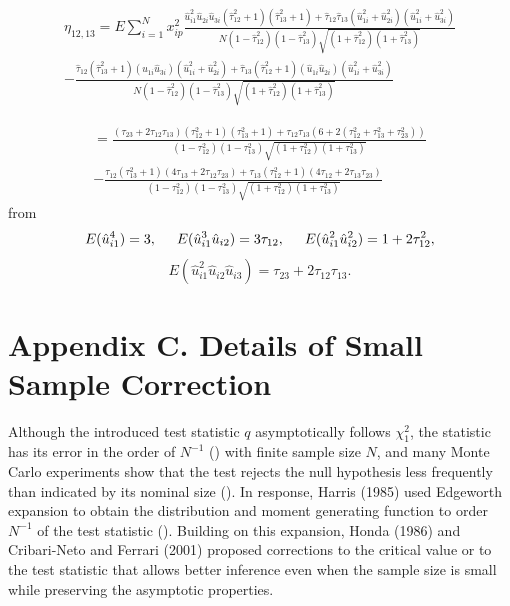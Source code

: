 \documentclass[aap,authoryear, preprint]{imsart}
\numberwithin{equation}{section}
\theoremstyle{plain}
\begin{document}
\begin{equation}
    \begin{multlined}
    \eta_{12,13} = E\sum_{i=1}^{N}x_{ip}^2  \frac{\hat{u}_{i1}^2 \hat{u}_{2i}\hat{u}_{3i}(\hat{\tau}_{12}^2+1)(\hat{\tau}_{13}^2+1)
    + \hat{\tau}_{12}\hat{\tau}_{13} (\hat{u}_{1i}^2 + \hat{u}_{2i}^2)(\hat{u}_{1i}^2 + \hat{u}_{3i}^2)}{N(1-\hat{\tau}_{12}^2)(1-\hat{\tau}_{13}^2)\sqrt{(1+\hat{\tau}_{12}^2)(1+\hat{\tau}_{13}^2)}} \\
    - \frac{\hat{\tau}_{12}(\hat{\tau}_{13}^2 + 1) (\hat{u}_{1i}\hat{u}_{3i})(\hat{u}_{1i}^2 + \hat{u}_{2i}^2) + \hat{\tau}_{13}(\hat{\tau}_{12}^2+1)(\hat{u}_{1i}\hat{u}_{2i})(\hat{u}_{1i}^2 + \hat{u}_{3i}^2)}{N(1-\hat{\tau}_{12}^2)(1-\hat{\tau}_{13}^2)\sqrt{(1+\hat{\tau}_{12}^2)(1+\hat{\tau}_{13}^2)}}
    \end{multlined} 
    \end{equation}
    
\begin{equation} \begin{multlined}
= \frac{(\tau_{23}+2\tau_{12}\tau_{13})(\tau_{12}^2+1)(\tau_{13}^2+1) + \tau_{12}\tau_{13}(6+2(\tau_{12}^2+\tau_{13}^2+\tau_{23}^2))}{(1-{\tau}_{12}^2)(1-{\tau}_{13}^2)\sqrt{(1+{\tau}_{12}^2)(1+{\tau}_{13}^2)}} \\
- \frac{\tau_{12}(\tau_{13}^2+1)(4\tau_{13}+2\tau_{12}\tau_{23}) + \tau_{13}(\tau_{12}^2+1)(4\tau_{12}+2\tau_{13}\tau_{23})}{(1-{\tau}_{12}^2)(1-{\tau}_{13}^2)\sqrt{(1+{\tau}_{12}^2)(1+{\tau}_{13}^2)}}
\end{multlined} \end{equation}
from
$$E(\hat{u}_{i1}^4) = 3, \hspace{5mm} E(\hat{u}_{i1}^3 \hat{u}_{i2}) = 3\tau_{12}, \hspace{5mm} E(\hat{u}_{i1}^2\hat{u}_{i2}^2) = 1 + 2\tau_{12}^2,$$
$$E(\hat{u}_{i1}^2 \hat{u}_{i2} \hat{u}_{i3}) = \tau_{23} + 2\tau_{12}\tau_{13}.$$

\section*{Appendix C. Details of Small Sample Correction}
Although the introduced test statistic $q$ asymptotically follows $\chi_1^2$, the statistic has its error in the order of $N^{-1}$ (\cite{harris1985asymptotic}) with finite sample size $N$, and many Monte Carlo experiments show that the test rejects the null hypothesis less frequently than indicated by its nominal size (\cite{godfrey1978testing, griffiths1986monte, honda1988size}). In response, Harris (1985) used Edgeworth expansion to obtain the distribution and moment generating function to order $N^{-1}$ of the test statistic (\cite{harris1985asymptotic}). Building on this expansion, Honda (1986) and Cribari-Neto and Ferrari (2001) proposed corrections to the critical value or to the test statistic that allows better inference even when the sample size is small while preserving the asymptotic properties.\\
\end{document}

